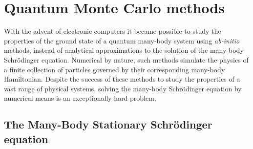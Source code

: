 
\chapter{Quantum Monte Carlo methods}%
\label{chap:quantum-monte-carlo-methods}

With the advent of electronic computers it became possible to study the
properties of the ground state of a quantum many-body system using
\emph{ab-initio} methods, instead of analytical approximations to the solution
of the many-body Schrödinger equation. Numerical by nature, such methods
simulate the physics of a finite collection of particles governed by their
corresponding many-body Hamiltonian. Despite the success of these methods to
study the properties of a vast range of physical systems, solving the many-body
Schrödinger equation by numerical means is an exceptionally hard problem.


\section{The Many-Body Stationary Schrödinger equation}

